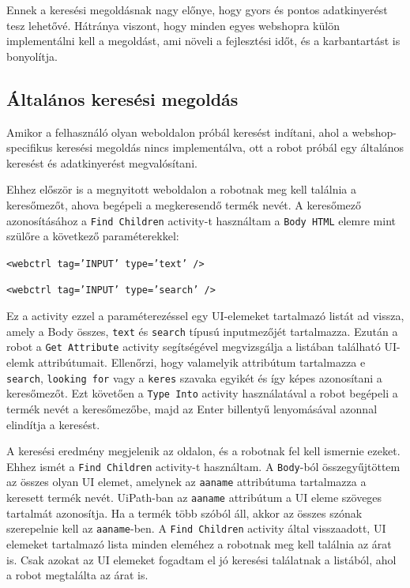 \documentclass[
]{thesis-ekf}
\theoremstyle{definition}
\theoremstyle{remark}
\begin{document}
Ennek a keresési megoldásnak nagy előnye, hogy gyors és pontos adatkinyerést tesz lehetővé. Hátránya viszont, hogy minden egyes webshopra külön implementálni kell a megoldást, ami növeli a fejlesztési időt, és a karbantartást is bonyolítja.

\subsection*{Általános keresési megoldás}

Amikor a felhasználó olyan weboldalon próbál keresést indítani, ahol a webshop-specifikus keresési megoldás nincs implementálva, ott a robot próbál egy általános keresést és adatkinyerést megvalósítani.

Ehhez először is a megnyitott weboldalon a robotnak meg kell találnia a keresőmezőt, ahova begépeli a megkeresendő termék nevét. A keresőmező azonosításához a \texttt{Find Children} activity-t használtam a \texttt{Body HTML} elemre mint szülőre a következő paraméterekkel:
\begin{center}
	\texttt{<webctrl tag='INPUT' type='text' />}
	
	\texttt{<webctrl tag='INPUT' type='search' />}
\end{center}
Ez a activity ezzel a paraméterezéssel egy UI-elemeket tartalmazó listát ad vissza, amely a Body összes, \texttt{text} és \texttt{search} típusú inputmezőjét tartalmazza. Ezután a robot a \texttt{Get Attribute} activity segítségével megvizsgálja a listában található UI-elemk attribútumait. Ellenőrzi, hogy valamelyik attribútum tartalmazza e \texttt{search}, \texttt{looking for} vagy a \texttt{keres} szavaka egyikét és így képes azonosítani a keresőmezőt. Ezt követően a \texttt{Type Into} activity használatával a robot begépeli a termék nevét a keresőmezőbe, majd az Enter billentyű lenyomásával azonnal elindítja a keresést.

A keresési eredmény megjelenik az oldalon, és a robotnak fel kell ismernie ezeket. Ehhez ismét a \texttt{Find Children} activity-t használtam. A \texttt{Body}-ból összegyűjtöttem az összes olyan UI elemet, amelynek az \texttt{aaname} attribútuma tartalmazza a keresett termék nevét. UiPath-ban az \texttt{aaname} attribútum a UI eleme szöveges tartalmát azonosítja. Ha a termék több szóból áll, akkor az összes szónak szerepelnie kell az \texttt{aaname}-ben. A \texttt{Find Children} activity által visszaadott, UI elemeket tartalmazó lista minden eleméhez a robotnak meg kell találnia az árat is. Csak azokat az UI elemeket fogadtam el jó keresési találatnak a listából, ahol a robot megtalálta az árat is.
\end{document}
